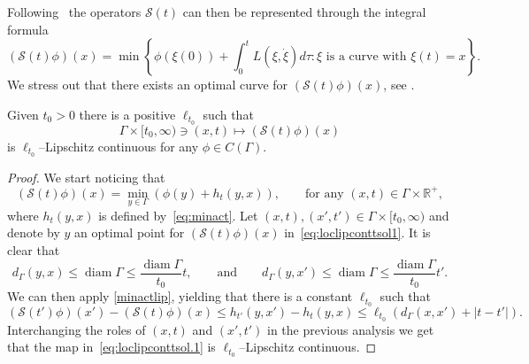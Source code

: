 \documentclass[11pt,a4paper,american]{article}
\DeclareMathOperator{\diam}{diam}
\newcommand{\Rds}{\mathds R}
\newcommand{\Scal}{\mathcal S}
\begin{document}
    Following~\cite{PozzaSiconolfi23} the operators $\Scal(t)$ can then be represented through the integral formula
    \begin{equation}\label{eq:vft}
        (\Scal(t)\phi)(x)=\min\left\{\phi(\xi(0))+\int_0^t L\left(\xi,\dot\xi\right)d\tau:\text{$\xi$ is a curve with $\xi(t)=x$}\right\}.
    \end{equation}
    We stress out that there exists an optimal curve for $(\Scal(t)\phi)(x)$, see \cite[Theorem 5.2]{PozzaSiconolfi23}.

    \begin{theo}\label{loclipconttsol}
        Given $t_0>0$ there is a positive $\ell_{t_0}$ such that
        \begin{equation}\label{eq:loclipconttsol.1}
            \Gamma\times[t_0,\infty)\ni(x,t)\longmapsto(\Scal(t)\phi)(x)
        \end{equation}
        is $\ell_{t_0}$--Lipschitz continuous for any $\phi\in C(\Gamma)$.
    \end{theo}
    \begin{proof}
        We start noticing that
        \begin{equation}\label{eq:loclipconttsol1}
            (\Scal(t)\phi)(x)=\min_{y\in\Gamma}(\phi(y)+h_t(y,x)),\qquad\text{for any }(x,t)\in\Gamma\times\Rds^+,
        \end{equation}
        where $h_t(y,x)$ is defined by~\cref{eq:minact}. Let $(x,t),(x',t')\in\Gamma\times[t_0,\infty)$ and denote by $y$ an optimal point for $(\Scal(t)\phi)(x)$ in~\cref{eq:loclipconttsol1}. It is clear that
        \begin{equation*}
            d_\Gamma(y,x)\le\diam\Gamma\le\frac{\diam\Gamma}{t_0}t,\qquad\text{and}\qquad d_\Gamma\left(y,x'\right)\le\diam\Gamma\le\frac{\diam\Gamma}{t_0}t'.
        \end{equation*}
        We can then apply \cref{minactlip}, yielding that there is a constant $\ell_{t_0}$ such that
        \begin{equation*}
            \left(\Scal\left(t'\right)\phi\right)\left(x'\right)-(\Scal(t)\phi)(x)\le h_{t'}\left(y,x'\right)-h_t(y,x)\le\ell_{t_0}\left(d_\Gamma\left(x,x'\right)+\left|t-t'\right|\right).
        \end{equation*}
        Interchanging the roles of $(x,t)$ and $(x',t')$ in the previous analysis we get that the map in~\cref{eq:loclipconttsol.1} is $\ell_{t_0}$--Lipschitz continuous.
    \end{proof}
\end{document}
